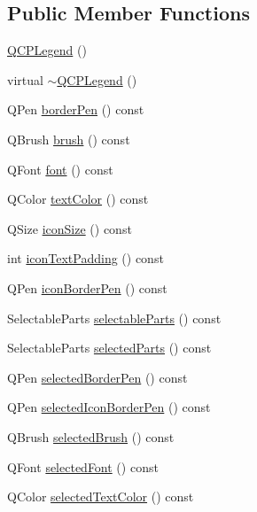 \subsection*{Public Member Functions}
\begin{DoxyCompactItemize}
\item 
\hyperlink{class_q_c_p_legend_a0001a456989bd07ea378883651fabd72}{Q\-C\-P\-Legend} ()
\item 
virtual \hyperlink{class_q_c_p_legend_a52b305572e20f4e7cb37e945e2b9bec0}{$\sim$\-Q\-C\-P\-Legend} ()
\item 
Q\-Pen \hyperlink{class_q_c_p_legend_a8ffd92df86ddf43696d95f04a20e3226}{border\-Pen} () const 
\item 
Q\-Brush \hyperlink{class_q_c_p_legend_a7e5d2766e7d724f399022be8a4e8a2cb}{brush} () const 
\item 
Q\-Font \hyperlink{class_q_c_p_legend_a5cf8b840bc02f7bf4edb8dde400d0f41}{font} () const 
\item 
Q\-Color \hyperlink{class_q_c_p_legend_ad60a058af7491f6b140c104c6a0f9458}{text\-Color} () const 
\item 
Q\-Size \hyperlink{class_q_c_p_legend_a27dfb770b14adc0e8811bef8129780a5}{icon\-Size} () const 
\item 
int \hyperlink{class_q_c_p_legend_a9d6d07042a284c4ba5f9e3cb5c9281ef}{icon\-Text\-Padding} () const 
\item 
Q\-Pen \hyperlink{class_q_c_p_legend_a2c4719d79630b0d0c75ef2333c59a912}{icon\-Border\-Pen} () const 
\item 
Selectable\-Parts \hyperlink{class_q_c_p_legend_aa90c7fdbad7a0e93527bafb1f1f49a43}{selectable\-Parts} () const 
\item 
Selectable\-Parts \hyperlink{class_q_c_p_legend_abbbf1b2d6a149013527ed87b0780894a}{selected\-Parts} () const 
\item 
Q\-Pen \hyperlink{class_q_c_p_legend_a63156bc4ce64431bada7415cfa2b4dd1}{selected\-Border\-Pen} () const 
\item 
Q\-Pen \hyperlink{class_q_c_p_legend_a165630cad7e41f89b54f65cdef3310e8}{selected\-Icon\-Border\-Pen} () const 
\item 
Q\-Brush \hyperlink{class_q_c_p_legend_a600dde0d207ddc6f5a603767360cceac}{selected\-Brush} () const 
\item 
Q\-Font \hyperlink{class_q_c_p_legend_a4c1b08fc0afacb4ffd54f6a49737fa77}{selected\-Font} () const 
\item 
Q\-Color \hyperlink{class_q_c_p_legend_a08005f3c17728c2c4e23b8ffc0842ffb}{selected\-Text\-Color} () const 

\end{DoxyCompactItemize}
